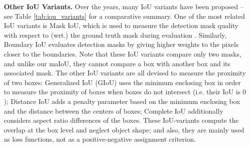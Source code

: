 \documentclass{bmvc2k}
\begin{document}
\noindent \textbf{Other IoU Variants.} Over the years, many IoU variants have been proposed -- see Table \ref{tab:iou_variants} for a comparative summary. One of the most related IoU variants is Mask IoU, which is used to measure the detection mask quality with respect to (wrt.) the ground truth mask during evaluation \cite{COCO,Cityscapes}. Similarly, Boundary IoU \cite{boundaryiou} evaluates detection masks by giving higher weights to  the pixels closer to the boundaries. Note that these IoU variants compare only two masks, and unlike our maIoU, they cannot compare a box  with another box and its associated mask. The other IoU variants are all devised to measure the proximity of two boxes: Generalized IoU (GIoU) \cite{GIoULoss} uses the minimum enclosing box in order to measure the proximity of boxes when boxes do not intersect (i.e. their IoU is $0$); Distance IoU \cite{DIoULoss} adds a penalty parameter based on the minimum enclosing box and the distance between the centers of boxes; Complete IoU \cite{CIoULoss} additionally considers aspect ratio differences of the boxes. These IoU-variants compute the overlap at the box level and neglect object shape; and also, they are mainly used as loss functions, not as a positive-negative assignment criterion.
\begin{comment}
\begin{table}[h!]
    \centering
    \begin{tabular}{|c|c|c|}
         \hline
         \textbf{Method} & \textbf{G.T.} & \textbf{Anchor} \\ \hline
         Mask IoU \cite{COCO, Cityscapes} & Mask & Mask \\ 
         Bounded IoU \cite{boundaryiou} & Mask & Mask \\ \hline
         GIoU \cite{GIoULoss} & Box & Box \\ 
         DIoU \cite{DIoULoss} & Box & Box \\ 
         CIoU \cite{DIoULoss} & Box & Box \\ \hline
         maIoU (This Work) & Box + Mask & Box \\ \hline
    \end{tabular}
    \caption{Summary of IoU variants considering their annotation types for both ground-truth (G.T.) and anchor boxes. The only method that uses both mask and box annotations is maIoU.}
    \label{tab:iou_variants}
\end{table}
\end{comment}
\end{document}

